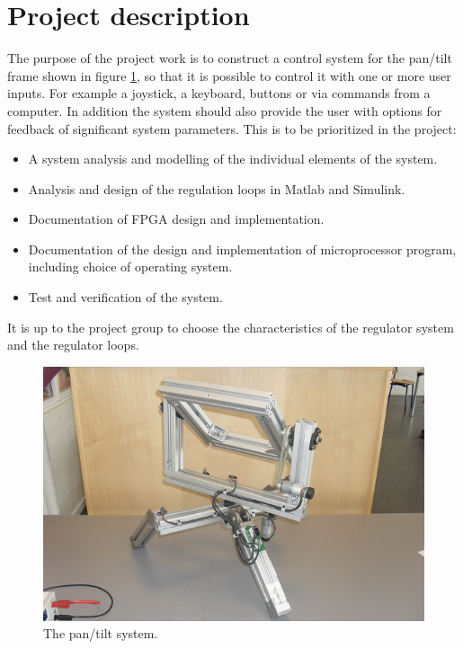 \section{Project description}
The purpose of the project work is to construct a control system for the pan/tilt frame shown in figure \ref{fig:pantiltsystem}, so that it is possible to control it with one or more user inputs. For example a joystick, a keyboard, buttons or via commands from a computer. In addition the system should also provide the user with options for feedback of significant system parameters. This is to be prioritized in the project:
\begin{itemize}
  \item A system analysis and modelling of the individual elements of the system.
  \item Analysis and design of the regulation loops in Matlab and Simulink.
  \item Documentation of FPGA design and implementation.
  \item Documentation of the design and implementation of microprocessor program, including choice of operating system.
  \item Test and verification of the system.
\end{itemize}


It is up to the project group to choose the characteristics of the regulator system and the regulator loops.

\begin{figure}[htb]
	\centering
	\includegraphics[width=\textwidth]{graphics/pantiltsystem.png} %
	\caption{The pan/tilt system.}
	\label{fig:pantiltsystem}
\end{figure}

